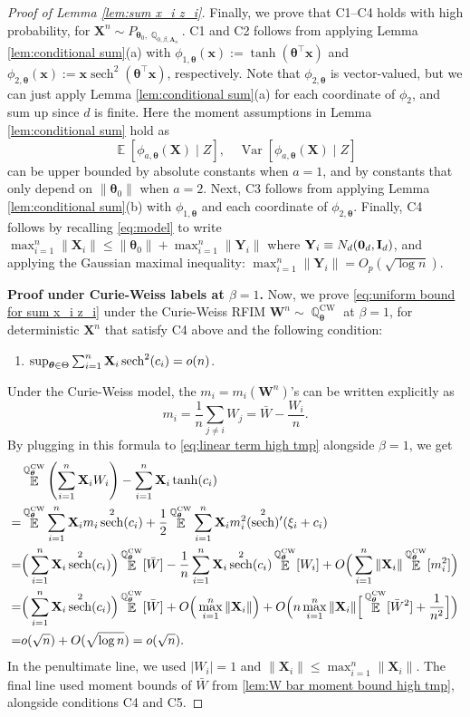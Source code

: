 \documentclass[preprint,reqno]{imsart}
\newcommand{\ttheta}{\boldsymbol{\theta}}
\newcommand{\I}{\mathbf{I}_{\mathnormal{d}}}
\DeclareMathOperator{\QQCW}{\QQ_{\ttheta}^{\text{CW}}}
\DeclareMathOperator{\sech}{sech}
\DeclareMathOperator{\EE}{\mathbb{E}}
\DeclareMathOperator{\Var}{Var}
\DeclareMathOperator{\QQ}{\mathbb{Q}}
\newcommand{\A}{\mathbf{A}}
\newcommand{\W}{\mathbf{W}}
\newcommand{\x}{\mathbf{x}}
\newcommand{\X}{\mathbf{X}}
\DeclareMathOperator{\sumin}{\sum_{\mathnormal i=1}^{\mathnormal n}}
\begin{document}
\begin{proof}[Proof of Lemma \ref{lem:sum x_i z_i}]
    \vspace{2mm}
    Finally, we prove that C1--C4 holds with high probability, for $\X^n \sim P_{\ttheta_0, \QQ_{0,\beta,\A_n}}$. C1 and C2 follows from applying Lemma \ref{lem:conditional sum}(a) with $\phi_{1, \ttheta}(\x) := \tanh(\ttheta^\top \x)$ and $\phi_{2, \ttheta}(\x) := \x \sech^2(\ttheta^\top \x)$, respectively. Note that $\phi_{2, \ttheta}$ is vector-valued, but we can just apply Lemma \ref{lem:conditional sum}(a) for each coordinate of $\phi_2$, and sum up since $d$ is finite. Here the moment assumptions in Lemma \ref{lem:conditional sum} hold as $$\EE \left[\phi_{a, \ttheta}(\X) \mid Z \right], \quad \Var \left[\phi_{a, \ttheta}(\X) \mid Z \right]$$ can be upper bounded by absolute constants when $a=1$, and by constants that only depend on $\|\ttheta_0\|$ when $a=2$. Next, C3 follows from applying Lemma \ref{lem:conditional sum}(b) with $\phi_{1, \ttheta}$ and each coordinate of $\phi_{2, \ttheta}$. Finally, C4 follows by recalling \eqref{eq:model} to write $\max_{i=1}^n \|\X_i\| \le \|\ttheta_0\| + \max_{i=1}^n \|\mathbf{Y}_i\|$ where $\mathbf{Y}_i \equiv N_d(\mathbf{0}_d, \I)$, and applying the Gaussian maximal inequality: $\max_{i=1}^n \|\mathbf{Y}_i\| = O_p(\sqrt{\log n})$.

\vspace{2mm}
\noindent \textbf{Proof under Curie-Weiss labels at $\beta = 1$.}
Now, we prove \eqref{eq:uniform bound for sum x_i z_i} under the Curie-Weiss RFIM $\W^n \sim \QQ_{\ttheta}^{\text{CW}}$ at $\beta = 1$, for deterministic $\X^n$ that satisfy C4 above and the following condition:
\begin{enumerate}
    \item[C5.] $\sup_{\ttheta \in \Theta} \sumin \X_i \sech^2(c_i) = o(n)$.
\end{enumerate}
Under the Curie-Weiss model, the $m_i = m_i(\W^n)$'s can be written explicitly as $$m_i = \frac{1}{n} \sum_{j \neq i} W_j = \bar{W} - \frac{W_i}{n}.$$
By plugging in this formula to \eqref{eq:linear term high tmp} alongside $\beta = 1$, we get
    \begin{align*}
        &\EE^{\QQCW} \left(\sumin \X_i W_i \right) - \sumin \X_i \tanh(c_i) \\
        =& \EE^{\QQCW} \sumin \X_i m_i \sech^2(c_i) + \frac{1}{2} \EE^{\QQCW} \sumin \X_i m_i^2 (\sech^2)'( \xi_i + c_i) \label{eq:linear term high tmp} \\
        =& \Big(\sumin \X_i \sech^2(c_i)\Big) \EE^{\QQCW} [\bar{W}] - \frac{1}{n}\sumin \X_i \sech^2(c_i) \EE^{\QQCW} [W_i] + O\Big(\sumin \|\X_i\|  \EE^{\QQCW} [m_i^2] \Big) \\
        =& \Big(\sumin \X_i \sech^2(c_i)\Big) \EE^{\QQCW} [\bar{W}] + O\Big( \max_{i=1}^n \| \X_i\| \Big) + O\Big(n \max_{i=1}^n \| \X_i \| \Big[\EE^{\QQCW} [\bar{W}^2] + \frac{1}{n^2} \Big] \Big) \\
        =& o(\sqrt{n}) + O(\sqrt{\log n}) =o(\sqrt{n}) .
    \end{align*}
    In the penultimate line, we used $|W_i| = 1$ and $\|\X_i\| \le \max_{i=1}^n \| \X_i \|$. The final line used moment bounds of $\bar{W}$ from \cref{lem:W bar moment bound high tmp}, alongside conditions C4 and C5.
    

\end{proof}
\end{document}
